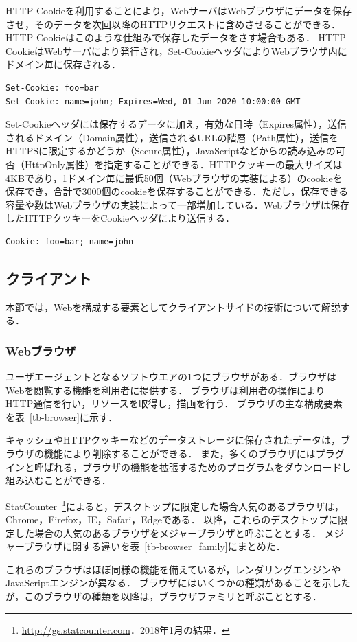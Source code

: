 HTTP Cookieを利用することにより，WebサーバはWebブラウザにデータを保存させ，そのデータを次回以降のHTTPリクエストに含めさせることができる．HTTP Cookieはこのような仕組みで保存したデータをさす場合もある．
HTTP CookieはWebサーバにより発行され，Set-CookieヘッダによりWebブラウザ内にドメイン毎に保存される．
\begin{verbatim}
Set-Cookie: foo=bar
Set-Cookie: name=john; Expires=Wed, 01 Jun 2020 10:00:00 GMT
\end{verbatim}
Set-Cookieヘッダには保存するデータに加え，有効な日時（Expires属性），送信されるドメイン（Domain属性），送信されるURLの階層（Path属性），送信をHTTPSに限定するかどうか（Secure属性），JavaScriptなどからの読み込みの可否（HttpOnly属性）を指定することができる．HTTPクッキーの最大サイズは4KBであり，1ドメイン毎に最低50個（Webブラウザの実装による）のcookieを保存でき，合計で3000個のcookieを保存することができる．ただし，保存できる容量や数はWebブラウザの実装によって一部増加している．Webブラウザは保存したHTTPクッキーをCookieヘッダにより送信する．
\begin{verbatim}
Cookie: foo=bar; name=john
\end{verbatim}
\subsection{クライアント}
本節では，Webを構成する要素としてクライアントサイドの技術について解説する．
\subsubsection{Webブラウザ}
ユーザエージェントとなるソフトウエアの1つにブラウザがある．ブラウザはWebを閲覧する機能を利用者に提供する．
ブラウザは利用者の操作によりHTTP通信を行い，リソースを取得し，描画を行う．
ブラウザの主な構成要素を表~\ref{tb-browser}に示す．

キャッシュやHTTPクッキーなどのデータストレージに保存されたデータは，ブラウザの機能により削除することができる． 
また，多くのブラウザにはプラグインと呼ばれる，ブラウザの機能を拡張するためのプログラムをダウンロードし組み込むことができる．

StatCounter~\footnote{\url{http://gs.statcounter.com}．2018年1月の結果．}によると，デスクトップに限定した場合人気のあるブラウザは，Chrome，Firefox，IE，Safari，Edgeである．
以降，これらのデスクトップに限定した場合の人気のあるブラウザをメジャーブラウザと呼ぶこととする．
メジャーブラウザに関する違いを表~\ref{tb-browser_family}にまとめた．

これらのブラウザはほぼ同様の機能を備えているが，レンダリングエンジンやJavaScriptエンジンが異なる．
ブラウザにはいくつかの種類があることを示したが，このブラウザの種類を以降は，ブラウザファミリと呼ぶこととする．
